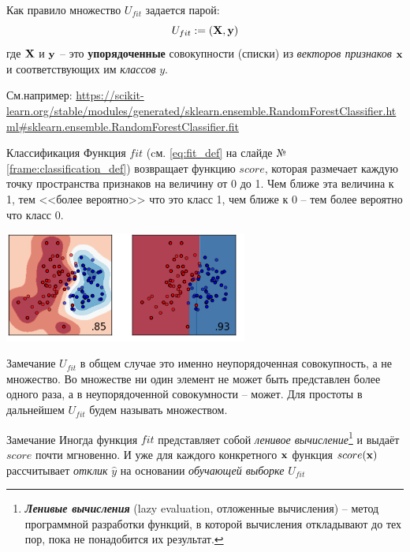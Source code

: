 \documentclass{beamer}
\newcommand{\termdef}[1]{\textbf{\textit{#1}}}
\newcommand{\term}{\textit}
\begin{document}
	\begin{frame}
	Как правило множество $U_{fit}$ задается парой:
	\begin{equation}
		U_{fit} := (\bold X, \bold y) 
	\end{equation}
	где $\bold X$ и $\bold y$ -- это \textbf{упорядоченные} совокупности (списки)
	из \term{векторов признаков} $\bold  x$ и соответствующих им \term{классов} $y$. 
	
	См.например:
	\url{https://scikit-learn.org/stable/modules/generated/sklearn.ensemble.RandomForestClassifier.html\#sklearn.ensemble.RandomForestClassifier.fit}
	\end{frame}


	  
	\begin{frame}{Классификация}
	Функция $fit$ (cм. \eqref{eq:fit_def} на слайде №\ref{frame:classification_def}) возвращает функцию $score$, которая размечает каждую точку пространства признаков на величину от 0 до 1. Чем ближе эта величина к 1, тем <<более вероятно>> что это класс 1, чем ближе к 0 -- тем более вероятно что класс 0.
	\begin{center}
		\includegraphics[width=8cm]{../pic/classification_example.png}\centering
	\end{center}
\end{frame}


 \begin{frame}
	 \begin{block}{Замечание}
	 	$U_{fit}$ в общем случае это именно неупорядоченная совокупность, а не множество. Во множестве ни один элемент не может быть представлен более одного раза, а в неупорядоченной совокумности -- может. Для простоты в дальнейшем 	$U_{fit}$ будем называть множеством.
	 \end{block}
	\begin{block}{Замечание}
		Иногда функция $fit$ представляет собой \term{ленивое вычисление}\footnote{
		\termdef{Ленивые вычисления} (lazy evaluation, отложенные вычисления) -- 
		метод программной разработки функций, в которой вычисления откладывают до тех пор,
		пока не понадобится их результат.
		} и выдаёт $score$ почти мгновенно. И уже для каждого конкретного $\bold x$ функция
		$score(\bold x)$ рассчитывает \term{отклик} $\hat{y}$ на основании 
		\term{обучающей выборке} \term{} $U_{fit}$
	\end{block}
   \end{frame}
  
\end{document}
